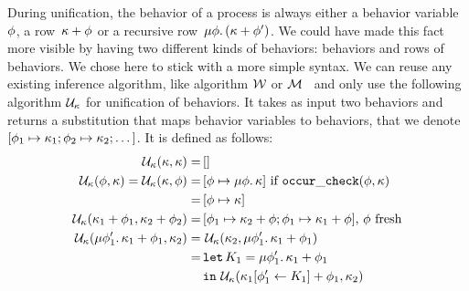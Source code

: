 \documentclass[9pt]{sigplanconf}
\begin{document}
During unification, the behavior of a process is always either a behavior variable~$\phi$, a row~$\kappa + \phi$ or a recursive row~$\mu \phi.\, (\kappa + \phi')$. We could have made this fact more visible by having two different kinds of behaviors: behaviors and rows of behaviors. We chose here to stick with a more simple syntax. We can reuse any existing inference algorithm, like algorithm $\mathcal{W}$ or $\mathcal{M}$~\cite{Lee:1998a} and only use the following algorithm $\mathcal{U}_{\kappa}$ for unification of behaviors. It takes as input two behaviors and returns a substitution that maps behavior variables to behaviors, that we denote $[\phi_1 \mapsto \kappa_1; \phi_2 \mapsto \kappa_2; \dots]$. It is defined as follows:
%
\allowdisplaybreaks
\begin{align*}
\mathcal{U}_{\kappa}(\kappa, \kappa) =&\, [] \\
\mathcal{U}_{\kappa}(\phi, \kappa) = \mathcal{U}_{\kappa}(\kappa, \phi) =
					&\, [\phi \mapsto  \mu \phi.\, \kappa ]  \text{ if } \mathtt{occur\_check}(\phi, \kappa) \\
					= &\,  [\phi \mapsto \kappa] \\
\mathcal{U}_{\kappa}(\kappa_1 + \phi_1, \kappa_2 + \phi_2) =&\,
                  [\phi_1 \mapsto \kappa_2 + \phi;  \phi_1 \mapsto \kappa_1 + \phi ]  \text{, } \phi \text{ fresh} \\
\mathcal{U}_{\kappa}(\mu \phi'_1.\, \kappa_1 + \phi_1, \kappa_2) 
    = &\, \,\mathcal{U}_{\kappa}(\kappa_2, \mu \phi'_1.\, \kappa_1 + \phi_1) \\ 
    = &\, \mathtt{let}\, K_1 = \mu \phi'_1.\, \kappa_1 + \phi_1 \\
    &\, \mathtt{in}\,\, \mathcal{U}_{\kappa}( \kappa_1[\phi'_1 \leftarrow K_1] + \phi_1 , \kappa_2) 
\end{align*}
\end{document}
